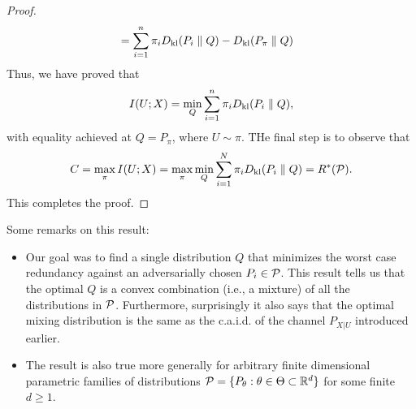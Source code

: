 \begin{proof}
\begin{align}
            & = \sum_{i=1}^n \pi_i D_{\text{kl}}(P_i \parallel Q) - D_{\text{kl}}(P_\pi \parallel Q) 
        \end{align}
        Thus, we have proved that 
        \begin{align}
            I(U; X) = \min_{Q}\sum_{i=1}^n \pi_i D_{\text{kl}}(P_i \parallel Q), 
        \end{align}
        with equality achieved at $Q = P_\pi$, where $U \sim \pi$. THe final step is to observe that 
        \begin{align}
            C = \max_{\pi} I(U; X) = \max_{\pi} \min_{Q} \sum_{i=1}^N \pi_i D_{\text{kl}}(P_i \parallel Q) = R^*(\mathcal{P}). 
        \end{align}
        This completes the proof. 
    \end{proof}

    Some remarks on this result: 
    \begin{itemize}
        \item Our goal was to find a single distribution $Q$ that minimizes the worst case redundancy against an adversarially chosen $P_i \in \mathcal{P}$. This result tells us that the optimal $Q$ is a convex combination (i.e., a mixture) of all the distributions in $\mathcal{P}$. Furthermore, surprisingly it also says that the optimal mixing distribution is the same as the c.a.i.d. of the channel $P_{X|U}$ introduced earlier. 
        \item The result is also true more generally for arbitrary finite dimensional parametric families of distributions $ \mathcal{P} = \{P_\theta: \theta \in \Theta \subset \mathbb{R}^d\}$ for some finite $d \geq 1$. 
    \end{itemize}

